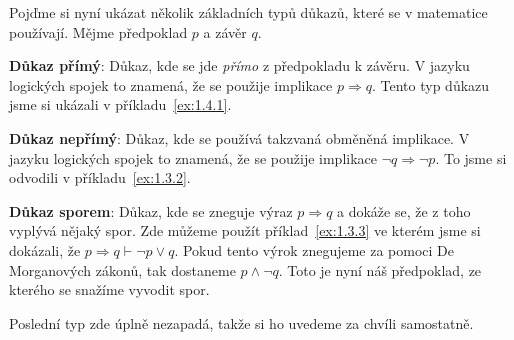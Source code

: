 \begin{definitionbox}
  Pojďme si nyní ukázat několik základních typů důkazů, které se v matematice používají. Mějme předpoklad $p$ a závěr $q$.

  \textbf{Důkaz přímý}: Důkaz, kde se jde \textit{přímo} z předpokladu k závěru. V jazyku logických spojek to znamená, že se použije implikace $p \Rightarrow q$. Tento typ důkazu jsme si ukázali v příkladu~\ref{ex:1.4.1}.

  \textbf{Důkaz nepřímý}: Důkaz, kde se používá takzvaná obměněná implikace. V jazyku logických spojek to znamená, že se použije implikace $\neg q \Rightarrow \neg p$. To jsme si odvodili v příkladu~\ref{ex:1.3.2}.

  \textbf{Důkaz sporem}: Důkaz, kde se zneguje výraz $p \Rightarrow q$ a dokáže se, že z toho vyplývá nějaký spor. Zde můžeme použít příklad~\ref{ex:1.3.3} ve kterém jsme si dokázali, že $p\Rightarrow q \vdash \neg p \lor q$. Pokud tento výrok znegujeme za pomoci De Morganových zákonů, tak dostaneme $p \land \neg q$. Toto je nyní náš předpoklad, ze kterého se snažíme vyvodit spor. 

  \vspace{0.1cm}

  Poslední typ zde úplně nezapadá, takže si ho uvedeme za chvíli samostatně.
\end{definitionbox}